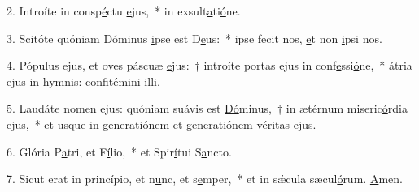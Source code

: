 2. Introíte in consp\uline{é}ctu \uline{e}jus,~* in exsult\uline{a}ti\uline{ó}ne.\par 
3. Scitóte quóniam Dóminus \uline{i}pse est D\uline{e}us:~* ipse fecit nos, \uline{e}t non \uline{i}psi nos.\par 
4. Pópulus ejus, et oves páscuæ \uline{e}jus:~† introíte portas ejus in conf\uline{e}ssi\uline{ó}ne,~* átria ejus in hymnis: confit\uline{é}mini \uline{i}lli.\par 
5. Laudáte nomen ejus: quóniam suávis est \uline{Dó}minus,~† in ætérnum miseric\uline{ó}rdia \uline{e}jus,~* et usque in generatiónem et generatiónem v\uline{é}ritas \uline{e}jus.\par 
6. Glória P\uline{a}tri, et F\uline{í}lio,~* et Spir\uline{í}tui S\uline{a}ncto.\par 
7. Sicut erat in princípio, et n\uline{u}nc, et s\uline{e}mper,~* et in sǽcula sæcul\uline{ó}rum. \uline{A}men.\par 
